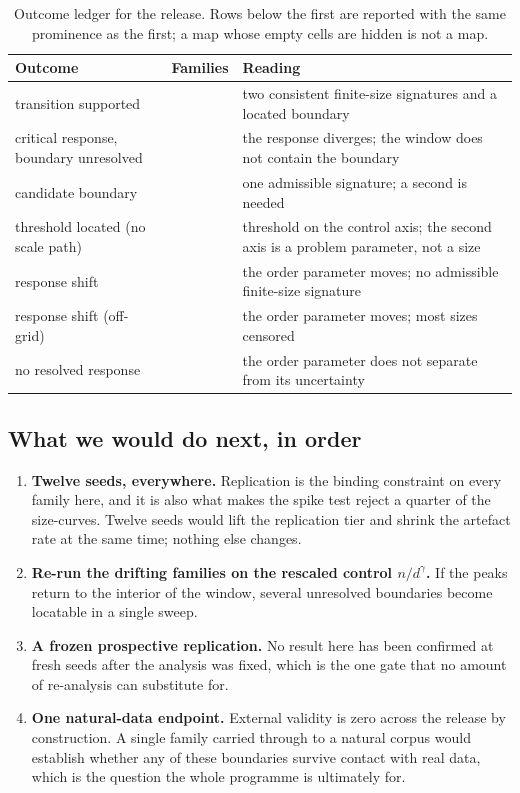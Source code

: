 \begin{table}[tbp]
\centering\small
\begin{tabularx}{\linewidth}{@{}p{34mm}p{20mm}Y@{}}
\toprule
Outcome & Families & Reading \\
\midrule
transition supported & \AtlasCountPhaseTransitionSupported{} & two consistent
finite-size signatures and a located boundary \\
critical response, boundary unresolved &
\AtlasCountCriticalResponseBoundaryUnresolved{} & the response diverges; the
window does not contain the boundary \\
candidate boundary & \AtlasCountCandidateBoundary{} & one admissible signature;
a second is needed \\
threshold located (no scale path) &
\AtlasCountThresholdLocatedNoScalePath{} & threshold on the control axis; the
second axis is a problem parameter, not a size \\
response shift & \AtlasCountResponseShift{} & the order parameter moves; no
admissible finite-size signature \\
response shift (off-grid) &
\AtlasCountResponseShiftBoundaryOutsideGrid{} & the order parameter moves;
most sizes censored \\
no resolved response & \AtlasCountNoResolvedResponse{} & the order parameter
does not separate from its uncertainty \\
\bottomrule
\end{tabularx}
\caption{Outcome ledger for the release. Rows below the first are reported with
the same prominence as the first; a map whose empty cells are hidden is not a
map.}
\label{tab:ledger}
\end{table}

\subsection{What we would do next, in order}

\begin{enumerate}
  \item \textbf{Twelve seeds, everywhere.} Replication is the binding
    constraint on every family here, and it is also what makes the spike test
    reject a quarter of the size-curves. Twelve seeds would lift the replication
    tier and shrink the artefact rate at the same time; nothing else changes.
  \item \textbf{Re-run the drifting families on the rescaled control
    $n/d^{\gamma}$.} If the peaks return to the interior of the window, several
    unresolved boundaries become locatable in a single sweep.
  \item \textbf{A frozen prospective replication.} No result here has been
    confirmed at fresh seeds after the analysis was fixed, which is the one
    gate that no amount of re-analysis can substitute for.
  \item \textbf{One natural-data endpoint.} External validity is zero across
    the release by construction. A single family carried through to a natural
    corpus would establish whether any of these boundaries survive contact with
    real data, which is the question the whole programme is ultimately for.
\end{enumerate}
